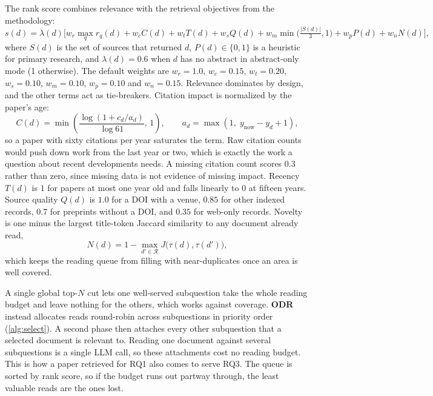 \documentclass[10pt,a4paper]{article}
\newcommand{\hfont}{\sffamily}
\renewcommand{\paragraph}[1]{%
  \par\vspace{0.35em}{\hfont\bfseries\color{accent}#1}\hspace{0.6em}\ignorespaces}
\newcommand{\sys}{{\hfont\bfseries ODR}}
\begin{document}
\paragraph{Ranking.} The rank score combines relevance with the retrieval
objectives from the methodology:
\begin{equation}
\label{eq:rank}
s(d) = \lambda(d)\Big[
  w_r \max_q r_q(d) + w_c C(d) + w_t T(d) + w_s Q(d)
  + w_m \min\!\big(\tfrac{|S(d)|}{3},1\big) + w_p P(d) + w_n N(d)
\Big],
\end{equation}
where $S(d)$ is the set of sources that returned $d$, $P(d)\in\{0,1\}$ is a
heuristic for primary research, and $\lambda(d)=0.6$ when $d$ has no
abstract in abstract-only mode (1 otherwise). The default weights are
$w_r=1.0$, $w_c=0.15$, $w_t=0.20$, $w_s=0.10$, $w_m=0.10$, $w_p=0.10$ and
$w_n=0.15$. Relevance dominates by design, and the other terms act as
tie-breakers. Citation impact is normalized by the paper's age:
\begin{equation}
C(d) = \min\!\left(\frac{\log(1 + c_d / a_d)}{\log 61},\, 1\right),
\qquad a_d = \max(1,\; y_{\text{now}} - y_d + 1),
\end{equation}
so a paper with sixty citations per year saturates the term. Raw citation
counts would push down work from the last year or two, which is exactly the
work a question about recent developments needs. A missing citation count
scores $0.3$ rather than zero, since missing data is not evidence of
missing impact. Recency $T(d)$ is $1$ for papers at most one year old and
falls linearly to $0$ at fifteen years. Source quality $Q(d)$ is $1.0$ for
a DOI with a venue, $0.85$ for other indexed records, $0.7$ for preprints
without a DOI, and $0.35$ for web-only records. Novelty is one minus the
largest title-token Jaccard similarity to any document already read,
\begin{equation}
N(d) = 1 - \max_{d' \in \mathcal{R}} J\big(\tau(d), \tau(d')\big),
\end{equation}
which keeps the reading queue from filling with near-duplicates once an
area is well covered.

\paragraph{Reading allocation.} A single global top-$N$ cut lets one
well-served subquestion take the whole reading budget and leave nothing
for the others, which works against coverage. \sys{} instead allocates
reads round-robin across subquestions in priority order
(\cref{alg:select}). A second phase then attaches every other subquestion
that a selected document is relevant to. Reading one document against
several subquestions is a single LLM call, so these attachments cost no
reading budget. This is how a paper retrieved for RQ1 also comes to serve
RQ3. The queue is sorted by rank score, so if the budget runs out partway
through, the least valuable reads are the ones lost.
\end{document}
